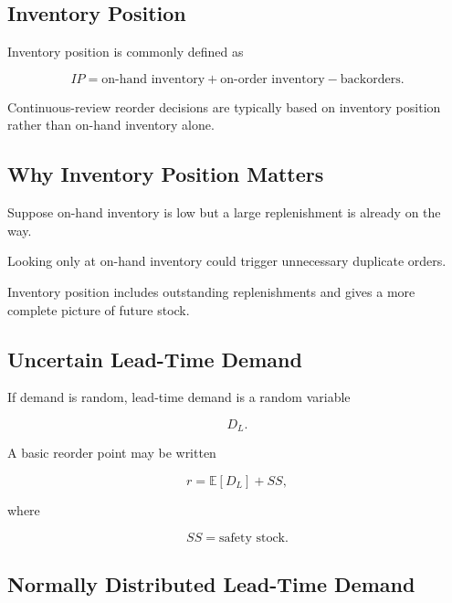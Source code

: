 \subsection{Inventory Position}
\label{subsec:inventory-position}

Inventory position is commonly defined as

\[
\boxed{
IP
=
\text{on-hand inventory}
+
\text{on-order inventory}
-
\text{backorders}.
}
\]

Continuous-review reorder decisions are typically based on inventory
position rather than on-hand inventory alone.

\subsection{Why Inventory Position Matters}
\label{subsec:why-inventory-position-matters}

Suppose on-hand inventory is low but a large replenishment is already on
the way.

Looking only at on-hand inventory could trigger unnecessary duplicate
orders.

Inventory position includes outstanding replenishments and gives a more
complete picture of future stock.

\subsection{Uncertain Lead-Time Demand}
\label{subsec:uncertain-lead-time-demand}

If demand is random, lead-time demand is a random variable

\[
\boxed{
D_L.
}
\]

A basic reorder point may be written

\[
\boxed{
r
=
\mathbb{E}[D_L]
+
SS,
}
\]

where

\[
SS
=
\text{safety stock}.
\]

\subsection{Normally Distributed Lead-Time Demand}
\label{subsec:normal-lead-time-demand}

